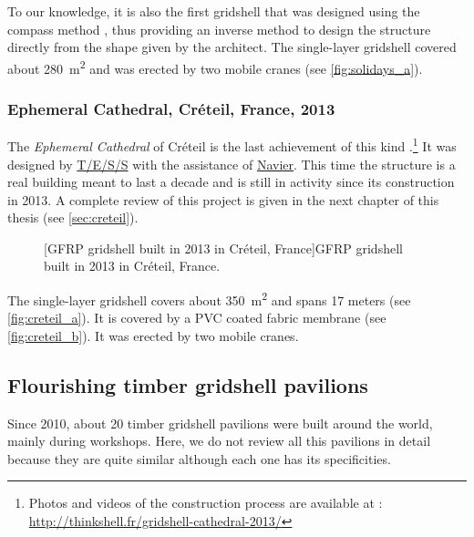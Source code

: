 To our knowledge, it is also the first gridshell that was designed using the compass method \cite{IL10}, thus providing an inverse method to design the structure directly from the shape given by the architect. The single-layer gridshell covered about \SI{280}{m^2} and was erected by two mobile cranes (see \cref{fig:solidays_a}).

\subsubsection{Ephemeral Cathedral, Créteil, France, 2013}
The \emph{Ephemeral Cathedral} of Créteil is the last achievement of this kind \cite{DuPeloux2016}.\footnote{Photos and videos of the construction process are available at : \url{http://thinkshell.fr/gridshell-cathedral-2013/}} It was designed by \href{http://www.tess.fr}{T/E/S/S} with the assistance of \href{http://navier.enpc.fr}{Navier}. This time the structure is a real building meant to last a decade and is still in activity since its construction in 2013. A complete review of this project is given in the next chapter of this thesis (see \cref{sec:creteil}).
\begin{figure}[h]
		\hspace*{\fill}
		\vspace{10pt}
		[GFRP gridshell built in 2013 in Créteil, France]{GFRP gridshell built in 2013 in Créteil, France.}
		\label{fig:creteil}    
\end{figure}

The single-layer gridshell covers about \SI{350}{m^2} and spans 17 meters (see \cref{fig:creteil_a}). It is covered by a PVC coated fabric membrane (see \cref{fig:creteil_b}). It was erected by two mobile cranes.


\subsection{Flourishing timber gridshell pavilions}
Since 2010, about 20 timber gridshell pavilions were built around the world, mainly during workshops. Here, we do not review all this pavilions in detail because they are quite similar although each one has its specificities.

